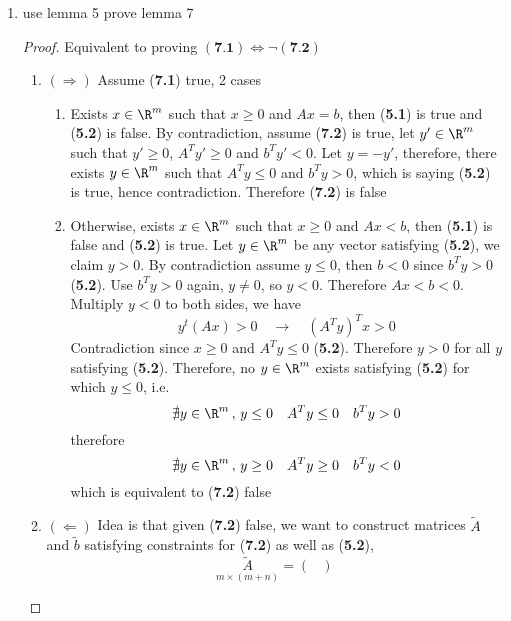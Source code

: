 \documentclass[11pt]{article}
\begin{document}
\begin{enumerate}
\item use lemma 5 prove lemma 7
    \begin{proof}
        Equivalent to proving $(\textbf{7.1}) \iff \neg (\textbf{7.2})$ 
        \begin{enumerate}
            \item $(\Rightarrow)$ Assume (\textbf{7.1}) true, 2 cases 
            \begin{enumerate}
                \item Exists $x\in \R^m$ such that $x\geq 0$ and $Ax = b$, then (\textbf{5.1}) is true and (\textbf{5.2}) is false. By contradiction, assume (\textbf{7.2}) is true, let $y' \in\R^m$ such that $y'\geq 0$, $A^T y' \geq 0$ and $b^T y' < 0$. Let $y = -y'$, therefore, there exists $y \in\R^m$ such that $A^T y \leq 0$ and $b^T y > 0$, which is saying (\textbf{5.2}) is true, hence contradiction. Therefore (\textbf{7.2}) is false  
                \item Otherwise, exists $x\in \R^m$ such that $x\geq 0$ and $Ax < b$, then (\textbf{5.1}) is false and (\textbf{5.2}) is true. Let $y\in \R^m$ be any vector satisfying (\textbf{5.2}), we claim $y > 0$. By contradiction assume $y \leq 0$, then $b < 0$ since $b^T y > 0$ (\textbf{5.2}). Use $b^T y > 0$ again, $y\neq 0$, so $y < 0$. Therefore $Ax < b < 0$. Multiply $y < 0$ to both sides, we have
                \[
                    y^t (Ax) > 0 
                    \quad \rightarrow \quad 
                    (A^T y)^T x > 0
                \]
                Contradiction since $x \geq 0$ and $A^T y \leq 0$ (\textbf{5.2}). Therefore $y> 0$ for all $y$ satisfying (\textbf{5.2}). Therefore, no $y\in \R^m$ exists satisfying (\textbf{5.2}) for which $y \leq 0$, i.e. 
                \[
                    \nexists y\in \R^m \, , \, y \leq 0 \quad A^T y\leq 0 \quad  b^T y > 0
                \]
                therefore 
                \[
                    \nexists y\in \R^m \, ,\, y\geq 0 \quad A^T y\geq 0 \quad b^T y < 0  
                \]
                which is equivalent to (\textbf{7.2}) false
            \end{enumerate}
            \item $(\Leftarrow)$
            Idea is that given (\textbf{7.2}) false, we want to construct matrices $\tilde{A}$ and $\tilde{b}$ satisfying constraints for (\textbf{7.2}) as well as (\textbf{5.2}), 
            \[
                \underset{m\times (m+n)}{\tilde{A}} = 
                \begin{pmatrix}

\end{pmatrix}\]
\end{enumerate}
\end{proof}
\end{enumerate}
\end{document}
